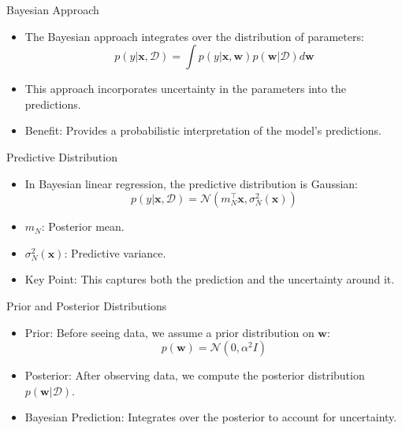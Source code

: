 \documentclass[serif, aspectratio=169]{beamer}
\begin{document}
\begin{frame}{Bayesian Approach}
    \begin{itemize}
        \item The Bayesian approach integrates over the distribution of parameters:
        \[
        p(y | \mathbf{x}, \mathcal{D}) = \int p(y | \mathbf{x}, \mathbf{w}) p(\mathbf{w} | \mathcal{D}) d\mathbf{w}
        \]
        \item This approach incorporates uncertainty in the parameters into the predictions.
        \item Benefit: Provides a probabilistic interpretation of the model’s predictions.
    \end{itemize}
\end{frame}

\begin{frame}{Predictive Distribution}
    \begin{itemize}
        \item In Bayesian linear regression, the predictive distribution is Gaussian:
        \[
        p(y | \mathbf{x}, \mathcal{D}) = \mathcal{N}(m_N^\top \mathbf{x}, \sigma_N^2(\mathbf{x}))
        \]
        \item \( m_N \): Posterior mean.
        \item \( \sigma_N^2(\mathbf{x}) \): Predictive variance.
        \item Key Point: This captures both the prediction and the uncertainty around it.
    \end{itemize}
\end{frame}

\begin{frame}{Prior and Posterior Distributions}
    \begin{itemize}
        \item Prior: Before seeing data, we assume a prior distribution on \( \mathbf{w} \):
        \[
        p(\mathbf{w}) = \mathcal{N}(0, \alpha^2 I)
        \]
        \item Posterior: After observing data, we compute the posterior distribution \( p(\mathbf{w} | \mathcal{D}) \).
        \item Bayesian Prediction: Integrates over the posterior to account for uncertainty.
    \end{itemize}
\end{frame}
\end{document}
